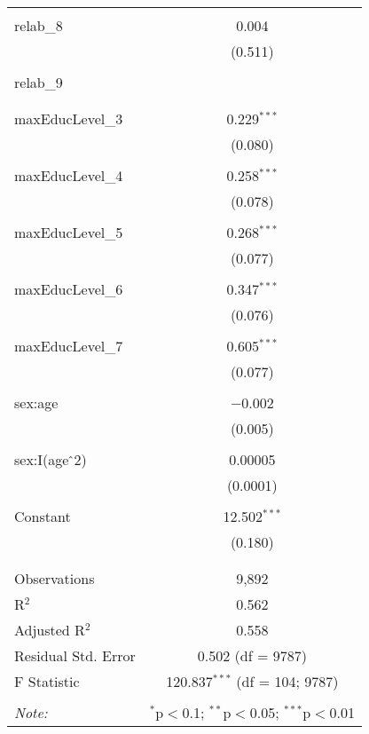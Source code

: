 \begin{table}[!htbp]
\begin{tabular}{@{\extracolsep{5pt}}lc}
  & \\ 
 relab\_8 & 0.004 \\ 
  & (0.511) \\ 
  & \\ 
 relab\_9 &  \\ 
  &  \\ 
  & \\ 
 maxEducLevel\_3 & 0.229$^{***}$ \\ 
  & (0.080) \\ 
  & \\ 
 maxEducLevel\_4 & 0.258$^{***}$ \\ 
  & (0.078) \\ 
  & \\ 
 maxEducLevel\_5 & 0.268$^{***}$ \\ 
  & (0.077) \\ 
  & \\ 
 maxEducLevel\_6 & 0.347$^{***}$ \\ 
  & (0.076) \\ 
  & \\ 
 maxEducLevel\_7 & 0.605$^{***}$ \\ 
  & (0.077) \\ 
  & \\ 
 sex:age & $-$0.002 \\ 
  & (0.005) \\ 
  & \\ 
 sex:I(age$\hat{\mkern6mu}$2) & 0.00005 \\ 
  & (0.0001) \\ 
  & \\ 
 Constant & 12.502$^{***}$ \\ 
  & (0.180) \\ 
  & \\ 
\hline \\[-1.8ex] 
Observations & 9,892 \\ 
R$^{2}$ & 0.562 \\ 
Adjusted R$^{2}$ & 0.558 \\ 
Residual Std. Error & 0.502 (df = 9787) \\ 
F Statistic & 120.837$^{***}$ (df = 104; 9787) \\ 
\hline 
\hline \\[-1.8ex] 
\textit{Note:}  & \multicolumn{1}{r}{$^{*}$p$<$0.1; $^{**}$p$<$0.05; $^{***}$p$<$0.01} \\ 
\end{tabular} 
\end{table} 

